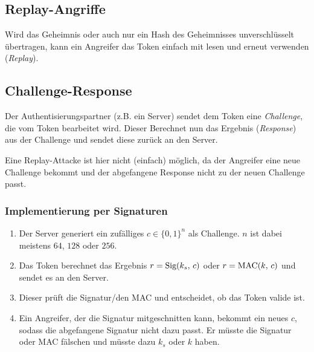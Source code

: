         \subsection{Replay-Angriffe}
            Wird das Geheimnis oder auch nur ein Hash des Geheimnisses unverschlüsselt übertragen, kann ein Angreifer das Token einfach mit lesen und erneut verwenden (\textit{Replay}).

        \subsection{Challenge-Response}
            Der Authentisierungspartner (z.B. ein Server) sendet dem Token eine \textit{Challenge}, die vom Token bearbeitet wird. Dieser Berechnet nun das Ergebnis (\textit{Response}) aus der Challenge und sendet diese zurück an den Server.
            
            Eine Replay-Attacke ist hier nicht (einfach) möglich, da der Angreifer eine neue Challenge bekommt und der abgefangene Response nicht zu der neuen Challenge passt.

            \subsubsection{Implementierung per Signaturen}
	            \begin{enumerate}
	            	\item Der Server generiert ein zufälliges \( c \in \{0,1\}^n \) als Challenge. \(n\) ist dabei meistens \(64\), \(128\) oder \(256\).
	            	\item Das Token berechnet das Ergebnis \( r = \textrm{Sig}(k_s,\, c) \) oder \( r = \textrm{MAC}(k,\, c) \) und sendet es an den Server.
	            	\item Dieser prüft die Signatur/den MAC und entscheidet, ob das Token valide ist.
	            	\item Ein Angreifer, der die Signatur mitgeschnitten kann, bekommt ein neues \(c\), sodass die abgefangene Signatur nicht dazu passt. Er müsste die Signatur oder MAC fälschen und müsste dazu \(k_s\) oder \(k\) haben.
	            \end{enumerate}

